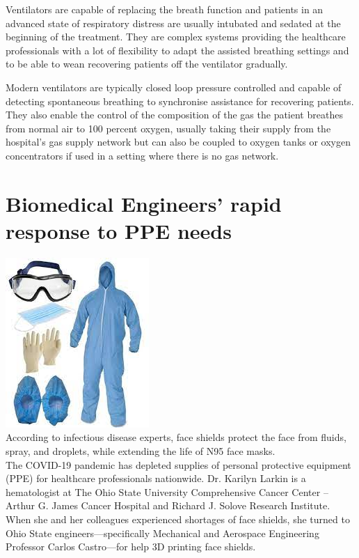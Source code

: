 \documentclass[12pt]{article}
\begin{document}
Ventilators are capable of replacing the breath function and patients in an advanced state of respiratory distress are usually intubated and sedated at the beginning of the treatment. They are complex systems providing the healthcare professionals with a lot of flexibility to adapt the assisted breathing settings and to be able to wean recovering patients off the ventilator gradually.

Modern ventilators are typically closed loop pressure controlled and capable of detecting spontaneous breathing to synchronise assistance for recovering patients. They also enable the control of the composition of the gas the patient breathes from normal air to 100 percent oxygen, usually taking their supply from the hospital’s gas supply network but can also be coupled to oxygen tanks or oxygen concentrators if used in a setting where there is no gas network.

\section{Biomedical Engineers’ rapid response to PPE needs}
\includegraphics[scale=0.7]{ppe.jpeg}\\
According to infectious disease experts, face shields protect the face from fluids, spray, and droplets, while extending the life of N95 face masks.
\\
The COVID-19 pandemic has depleted supplies of personal protective equipment (PPE) for healthcare professionals nationwide. Dr. Karilyn Larkin is a hematologist at The Ohio State University Comprehensive Cancer Center – Arthur G. James Cancer Hospital and Richard J. Solove Research Institute. When she and her colleagues experienced shortages of face shields, she turned to Ohio State engineers—specifically Mechanical and Aerospace Engineering Professor Carlos Castro—for help 3D printing face shields.
\end{document}
